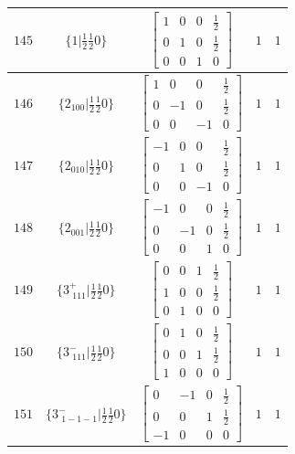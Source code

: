 \documentclass[fleqn,8pt]{jsarticle}
\begin{document}
\begin{longtable}{ccccc}
$ 145 $ & $ \{1|\frac{1}{2} \frac{1}{2} 0\} $ & $ \begin{bmatrix} 1 & 0 & 0 & \frac{1}{2} \\ 0 & 1 & 0 & \frac{1}{2} \\ 0 & 0 & 1 & 0 \end{bmatrix} $ & $ 1 $ & $ 1 $ \\ \hline
$ 146 $ & $ \{2{}_{100}|\frac{1}{2} \frac{1}{2} 0\} $ & $ \begin{bmatrix} 1 & 0 & 0 & \frac{1}{2} \\ 0 & -1 & 0 & \frac{1}{2} \\ 0 & 0 & -1 & 0 \end{bmatrix} $ & $ 1 $ & $ 1 $ \\ \hline
$ 147 $ & $ \{2{}_{010}|\frac{1}{2} \frac{1}{2} 0\} $ & $ \begin{bmatrix} -1 & 0 & 0 & \frac{1}{2} \\ 0 & 1 & 0 & \frac{1}{2} \\ 0 & 0 & -1 & 0 \end{bmatrix} $ & $ 1 $ & $ 1 $ \\ \hline
$ 148 $ & $ \{2{}_{001}|\frac{1}{2} \frac{1}{2} 0\} $ & $ \begin{bmatrix} -1 & 0 & 0 & \frac{1}{2} \\ 0 & -1 & 0 & \frac{1}{2} \\ 0 & 0 & 1 & 0 \end{bmatrix} $ & $ 1 $ & $ 1 $ \\ \hline
$ 149 $ & $ \{3^{+}_{\,\,111}|\frac{1}{2} \frac{1}{2} 0\} $ & $ \begin{bmatrix} 0 & 0 & 1 & \frac{1}{2} \\ 1 & 0 & 0 & \frac{1}{2} \\ 0 & 1 & 0 & 0 \end{bmatrix} $ & $ 1 $ & $ 1 $ \\ \hline
$ 150 $ & $ \{3^{-}_{\,\,111}|\frac{1}{2} \frac{1}{2} 0\} $ & $ \begin{bmatrix} 0 & 1 & 0 & \frac{1}{2} \\ 0 & 0 & 1 & \frac{1}{2} \\ 1 & 0 & 0 & 0 \end{bmatrix} $ & $ 1 $ & $ 1 $ \\ \hline
$ 151 $ & $ \{3^{-}_{\,\,1-1-1}|\frac{1}{2} \frac{1}{2} 0\} $ & $ \begin{bmatrix} 0 & -1 & 0 & \frac{1}{2} \\ 0 & 0 & 1 & \frac{1}{2} \\ -1 & 0 & 0 & 0 \end{bmatrix} $ & $ 1 $ & $ 1 $ \\ \hline

\end{longtable}
\end{document}
